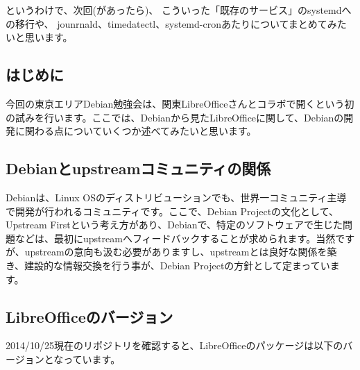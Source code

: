 \documentclass[mingoth,a4paper]{jsarticle}
\begin{document}
というわけで、次回(があったら)、
こういった「既存のサービス」のsystemdへの移行や、
jounrnald、timedatectl、systemd-cronあたりについてまとめてみたいと思います。


\subsection{はじめに}

 今回の東京エリアDebian勉強会は、関東LibreOfficeさんとコラボで開くという初の試みを行います。ここでは、Debianから見たLibreOfficeに関して、Debianの開発に関わる点についていくつか述べてみたいと思います。

\subsection{Debianとupstreamコミュニティの関係}

 Debianは、Linux OSのディストリビューションでも、世界一コミュニティ主導で開発が行われるコミュニティです。ここで、Debian Projectの文化として、Upstream Firstという考え方があり、Debianで、特定のソフトウェアで生じた問題などは、最初にupstreamへフィードバックすることが求められます。当然ですが、upstreamの意向も汲む必要がありますし、upstreamとは良好な関係を築き、建設的な情報交換を行う事が、Debian Projectの方針として定まっています。

\subsection{LibreOfficeのバージョン}

 2014/10/25現在のリポジトリを確認すると、LibreOfficeのパッケージは以下のバージョンとなっています。
\end{document}
